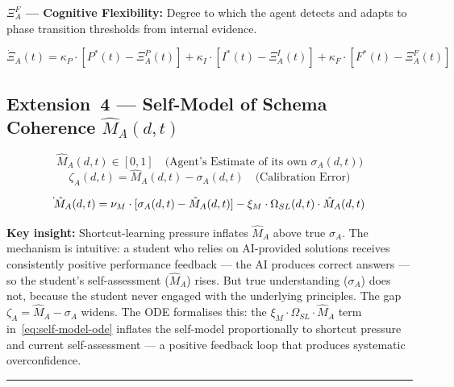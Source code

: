 \documentclass[11pt]{article}
\theoremstyle{definition}
\theoremstyle{plain}
\begin{document}
\textbf{$\Xi_A^F$ --- Cognitive Flexibility:} Degree to which the agent
detects and adapts to phase transition thresholds from internal evidence.

\begin{equation}\label{eq:executive-ode}
\dot{\Xi}_A(t) = \kappa_P \cdot [P^*(t) - \Xi_A^P(t)] + \kappa_I \cdot [I^*(t) - \Xi_A^I(t)] + \kappa_F \cdot [F^*(t) - \Xi_A^F(t)] %
\end{equation}

\subsection{Extension~4 --- Self-Model of Schema Coherence \texorpdfstring{$\hat{M}_A(d,t)$}{M-hat\_A(d,t)}}\label{sec:metacognition}

\begin{equation}\label{eq:self-model}
\hat{M}_A(d,t) \in [0,1] \quad \text{(Agent's Estimate of its own } \sigma_A(d,t))
\end{equation}
\begin{equation}\label{eq:calibration-error}
\zeta_A(d,t) = \hat{M}_A(d,t) - \sigma_A(d,t) \quad \text{(Calibration Error)}
\end{equation}

\begin{equation}\label{eq:self-model-ode}
\dot{\vphantom{M}}\hat{M}_A(d,t) = \nu_M \cdot [\sigma_A(d,t) - \hat{M}_A(d,t)] - \xi_M \cdot \Omega_{SL}(d,t) \cdot \hat{M}_A(d,t)
\end{equation}

\textbf{Key insight:} Shortcut-learning pressure inflates $\hat{M}_A$ above true
$\sigma_A$. The mechanism is intuitive: a student who relies on AI-provided
solutions receives consistently positive performance feedback --- the AI
produces correct answers --- so the student's self-assessment ($\hat{M}_A$)
rises. But true understanding ($\sigma_A$) does not, because the student
never engaged with the underlying principles. The gap $\zeta_A = \hat{M}_A - \sigma_A$
widens. The ODE formalises this: the $\xi_M \cdot \Omega_{SL} \cdot \hat{M}_A$ term
in~\eqref{eq:self-model-ode} inflates the self-model proportionally to
shortcut pressure and current self-assessment --- a positive feedback loop
that produces systematic overconfidence.



\noindent\rule{\linewidth}{0.4pt}

\end{document}
